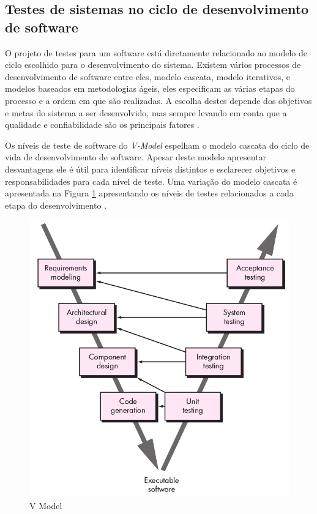 \documentclass[dm,ppgcomp]{texfurg} %
\begin{document}

\subsection{Testes de sistemas no ciclo de desenvolvimento de software}

O projeto de testes para um software está diretamente relacionado ao modelo de ciclo escolhido para o desenvolvimento do sistema. Existem vários processos de desenvolvimento de software entre eles, modelo cascata, modelo iterativos, e modelos baseados em metodologias ágeis, eles especificam as várias etapas do processo e a ordem em que são realizadas. A escolha destes depende dos objetivos e metas do sistema a ser desenvolvido, mas sempre levando em conta que a qualidade e confiabilidade são os principais fatores \cite{graham2008foundations}.


Os níveis de teste de software do \textit{V-Model} espelham o modelo cascata do ciclo de vida de desenvolvimento de software. Apesar deste modelo apresentar desvantagens ele é útil para identificar níveis distintos e esclarecer objetivos e responsabilidades para cada nível de teste. Uma variação do modelo cascata é apresentada na Figura \ref{fig:v-model} apresentando os níveis de testes relacionados a cada etapa do desenvolvimento \cite{jorgensen2016software}. 

\begin{figure}[ht]
\centering
\includegraphics[scale=0.3]{imagens/v-model.png}
\caption{V Model}
\label{fig:v-model}
\end{figure}
\end{document}
